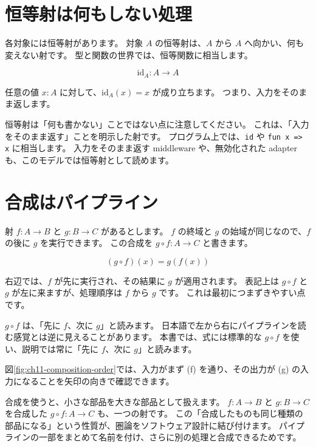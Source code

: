 \section{恒等射は何もしない処理}

各対象には恒等射があります。
対象 \(A\) の恒等射は、\(A\) から \(A\) へ向かい、何も変えない射です。
型と関数の世界では、恒等関数に相当します。

\[
  \mathrm{id}_A : A \to A
\]

任意の値 \(x : A\) に対して、\(\mathrm{id}_A(x) = x\) が成り立ちます。
つまり、入力をそのまま返します。

恒等射は「何も書かない」ことではない点に注意してください。
これは、「入力をそのまま返す」ことを明示した射です。
プログラム上では、\texttt{id} や \texttt{fun x => x} に相当します。
入力をそのまま返す middleware や、無効化された adapter も、このモデルでは恒等射として読めます。

\section{合成はパイプライン}

射 \(f : A \to B\) と \(g : B \to C\) があるとします。
\(f\) の終域と \(g\) の始域が同じなので、\(f\) の後に \(g\) を実行できます。
この合成を \(g \circ f : A \to C\) と書きます。

\[
  (g \circ f)(x) = g(f(x))
\]

右辺では、\(f\) が先に実行され、その結果に \(g\) が適用されます。
表記上は \(g \circ f\) と \(g\) が左に来ますが、処理順序は \(f\) から \(g\) です。
これは最初につまずきやすい点です。

\(g \circ f\) は、「先に \(f\)、次に \(g\)」と読みます。
日本語で左から右にパイプラインを読む感覚とは逆に見えることがあります。
本書では、式には標準的な \(g \circ f\) を使い、説明では常に「先に \(f\)、次に \(g\)」と読みます。

図\ref{fig:ch11-composition-order}では、入力がまず (f) を通り、その出力が (g) の入力になることを矢印の向きで確認できます。


合成を使うと、小さな部品を大きな部品として扱えます。
\(f : A \to B\) と \(g : B \to C\) を合成した \(g \circ f : A \to C\) も、一つの射です。
この「合成したものも同じ種類の部品になる」という性質が、圏論をソフトウェア設計に結び付けます。
パイプラインの一部をまとめて名前を付け、さらに別の処理と合成できるためです。

